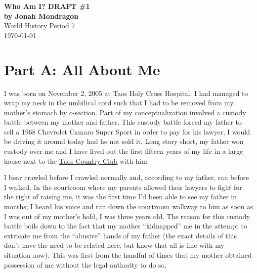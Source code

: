 \documentclass[12pt]{article}
\begin{document}
\doublespacing

\begin{titlepage}
    \begin{center}
        \vspace*{1.5in}
        {\huge\bfseries{Who Am I? DRAFT \#1}}\\
            {\bfseries{by Jonah Mondragon}}\\
            World History Period 7\\
            \today
    \end{center}
\end{titlepage}

\section*{Part A: All About Me}

I was born on November 2, 2005 at Taos Holy Cross Hospital.
I had managed to wrap my neck in the umbilical cord such that I had to be removed from my 
    mother's stomach by c-section.
Part of my conceptualization involved a custody battle between my mother and father.
This custody battle forced my father to sell a 1968 Chevrolet Camaro Super Sport
    in order to pay for his lawyer, I would be driving it around today had he not sold it.
Long story short, my father won custody over me and I have lived out the first fifteen years of my 
    life in a large house next to the {\color{blue}\underline{\href{https://www.taoscountryclub.com/}{Taos Country Club}}} with him.

I bear crawled before I crawled normally and, according to my father, ran before I walked.
In the courtroom where my parents allowed their lawyers to fight for the right of raising me,
    it was the first time I'd been able to see my father in months; %
    I heard his voice and ran down the courtroom walkway to him as soon as I was out of 
    my mother's hold, I was three years old. %
The reason for this custody battle boils down to the fact that my mother  ``kidnapped'' me in the
    attempt to extricate me from the ``abusive'' hands of my father (the exact details of this don't
    have the need to be related here, but know that all is fine with my situation now).
This was first from the handful of times that my mother obtained possession of me without the
    legal authority to do so.
\end{document}
